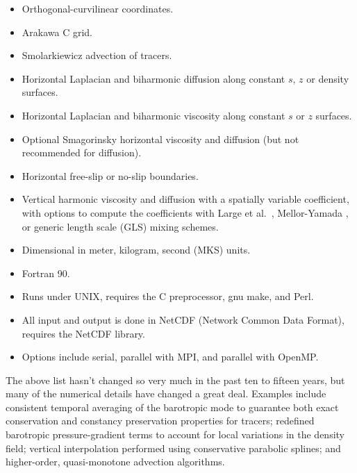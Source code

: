 \begin{klist}
\begin{itemize}
  \item Orthogonal-curvilinear coordinates.
  \item Arakawa C grid.
  \item Smolarkiewicz advection of tracers.
\end{itemize}
 \mbox{}
\begin{itemize}
  \item Horizontal Laplacian and biharmonic
    diffusion along constant $s$, $z$ or density
    surfaces.
  \item Horizontal Laplacian and biharmonic viscosity
    along constant $s$ or $z$ surfaces.
  \item Optional Smagorinsky horizontal viscosity and diffusion (but
  not recommended for diffusion).
  \item Horizontal free-slip or no-slip boundaries.
  \item Vertical harmonic viscosity and diffusion with a spatially
    variable coefficient, with options to compute the coefficients
    with Large et al.\ \cite{Large94}, Mellor-Yamada \cite{Mellor74},
    or generic length scale (GLS) \cite{Umlauf2001} mixing schemes.
\end{itemize}
 \mbox{}
\begin{itemize}
  \item Dimensional in meter, kilogram, second (MKS) units.
  \item Fortran 90.
  \item Runs under UNIX, requires the C preprocessor, gnu make, and
  Perl.
  \item All input and output is done in NetCDF \cite{netCDF} (Network
    Common Data Format), requires the NetCDF library.
  \item Options include serial, parallel with MPI, and parallel with
  OpenMP.
\end{itemize}
\end{klist}
The above list hasn't changed so very much in the past ten to fifteen
years, but many of the numerical details have changed a great deal.
Examples include consistent temporal averaging of the barotropic
mode to guarantee both exact conservation and constancy preservation
properties for tracers; redefined barotropic pressure-gradient terms
to account for local variations in the density field; vertical
interpolation performed using conservative parabolic splines; and
higher-order, quasi-monotone advection algorithms.

